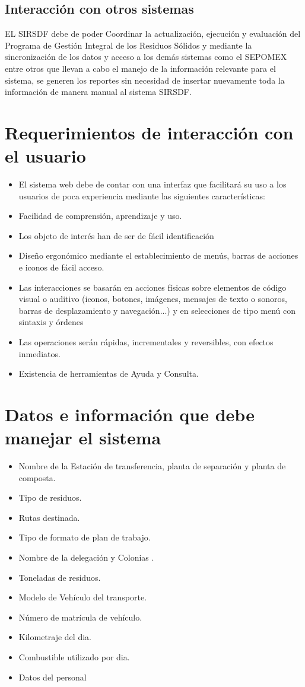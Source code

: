 \subsection{Interacción con otros sistemas}
	EL SIRSDF debe de poder Coordinar la actualización, ejecución y evaluación del Programa de Gestión Integral de los Residuos Sólidos y mediante la sincronización de los datos y acceso a los demás sistemas como el SEPOMEX entre otros que llevan a cabo el manejo de la información relevante para el sistema, se generen los reportes sin necesidad de insertar nuevamente toda la información de manera manual al sistema SIRSDF.
	

\section{Requerimientos de interacción con el usuario}
	\begin{itemize}
	\item El sistema web debe de contar con una  interfaz que facilitará su uso a los  usuarios de poca experiencia mediante las siguientes características:
	\item Facilidad de comprensión, aprendizaje y uso.
	\item Los objeto de interés han de ser de fácil identificación
	\item Diseño ergonómico mediante el establecimiento de menús, barras de acciones e iconos de fácil acceso.
	\item Las interacciones se basarán en acciones físicas sobre elementos de código visual o auditivo (iconos, botones, imágenes, mensajes de texto o sonoros, barras de desplazamiento y navegación...) y en selecciones de tipo menú con sintaxis y órdenes
	\item Las operaciones serán rápidas, incrementales y reversibles, con efectos inmediatos.
	\item Existencia de herramientas de Ayuda y Consulta.
	
	\end{itemize}
\section{Datos e información que debe manejar el sistema}
	\begin{itemize}
		\item Nombre de la Estación de transferencia, planta de separación y planta de 	composta.
		\item Tipo de residuos.
		\item Rutas destinada.
		\item Tipo de formato de plan de trabajo.
		\item Nombre de la delegación y Colonias . 
		\item Toneladas de residuos.
		\item Modelo de Vehículo  del transporte.
		\item Número de matrícula de vehículo.
	\item 	Kilometraje del dia.
	\item 	Combustible utilizado por dia.
		\item Datos del personal
		
	\end{itemize}

